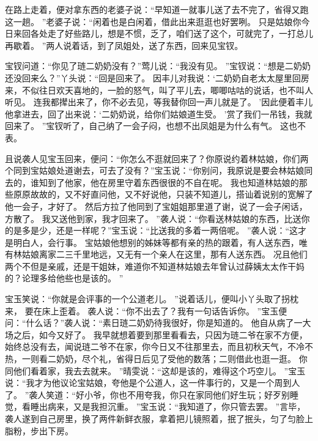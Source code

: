 在路上走着，便对拿东西的老婆子说：“早知道一就事儿送了去不完了，省得又跑这一趟。
”老婆子说：“闲着也是白闲着，借此出来逛逛也好罢咧。
只是姑娘你今日来回各处走了好些路儿，想是不惯，乏了，咱们送了这个，可就完了，一打总儿再歇着。
”两人说着话，到了凤姐处，送了东西，回来见宝钗。
\par
宝钗问道：“你见了琏二奶奶没有？”莺儿说：“我没有见。
”宝钗说：“想是二奶奶还没回来么？”丫头说：“回是回来了。
因丰儿对我说：‘二奶奶自老太太屋里回房来，不似往日欢天喜地的，一脸的怒气，叫了平儿去，唧唧咕咕的说话，也不叫人听见。
连我都撵出来了，你不必去见，等我替你回一声儿就是了。
’因此便着丰儿他拿进去，回了出来说：‘二奶奶说，给你们姑娘道生受。
’赏了我们一吊钱，我就回来了。
”宝钗听了，自己纳了一会子闷，也想不出凤姐是为什么有气。
这也不表。
\par
且说袭人见宝玉回来，便问：“你怎么不逛就回来了？你原说约着林姑娘，你们两个同到宝姑娘处道谢去，可去了没有？”宝玉说：“你别问，我原说是要会林姑娘同去的，谁知到了他家，他在房里守着东西很很的不自在呢。
我也知道林姑娘的那些原原故故的，又不好直问他，又不好说他，只装不知道儿，搭讪着说别的宽解了他一会子，才好了。
然后方拉了他同到了宝姐姐那里道了谢，说了一会子闲话，方散了。
我又送他到家，我才回来了。
”袭人说：“你看送林姑娘的东西，比送你的是多是少，还是一样呢？”宝玉说：“比送我的多着一两倍呢。
”袭人说：“这才是明白人，会行事。
宝姑娘他想别的姊妹等都有亲的热的跟着，有人送东西，唯有林姑娘离家二三千里地远，又无有一个亲人在这里，那有人送东西。
况且他们两个不但是亲戚，还是干姐妹，难道你不知道林姑娘去年曾认过薛姨太太作干妈的？论理多给他些也是该的。
”\par
宝玉笑说：“你就是会评事的一个公道老儿。
”说着话儿，便叫小丫头取了拐枕来，
要在床上歪着。
袭人说：“你不出去了？我有一句话告诉你。
”宝玉便问：“什么话？”袭人说：“素日琏二奶奶待我很好，你是知道的。
他自从病了一大场之后，如今又好了。
我早就想着要到那里看看去，只因为琏二爷在家不方便，始终总没有去，闻说琏二爷不在家，你今日又不往那里去，而且初秋天气，不冷不热，一则看二奶奶，尽个礼，省得日后见了受他的数落；二则借此也逛一逛。
你同他们看着家，我去去就来。
”晴雯说：“这却是该的，难得这个巧空儿。
”宝玉说：“我才为他议论宝姑娘，夸他是个公道人，这一件事行的，又是一个周到人了。
”袭人笑道：“好小爷，你也不用夸我，你只在家同他们好生玩；好歹别睡觉，看睡出病来，又是我担沉重。
”宝玉说：“我知道了，你只管去罢。
”言毕，袭人遂到自己房里，换了两件新鲜衣服，拿着把儿镜照着，抿了抿头，匀了匀脸上脂粉，步出下房。
